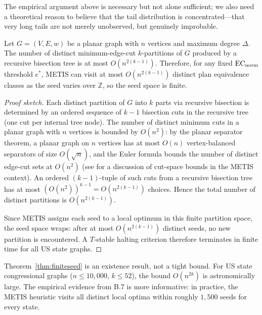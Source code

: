 The empirical argument above is necessary but not alone sufficient; we also
need a theoretical reason to believe that the tail distribution is
concentrated---that very long tails are not merely unobserved, but genuinely
improbable.

\begin{theorem}
\label{thm:finiteseed}
Let $G = (V, E, w)$ be a planar graph with $n$ vertices and maximum
degree $\Delta$.
The number of distinct minimum-edge-cut $k$-partitions of $G$ produced
by a recursive bisection tree is at most $O(n^{2(k-1)})$.
Therefore, for any fixed $\mathrm{EC}_{\mathrm{norm}}$ threshold $e^*$, METIS can visit at most
$O(n^{2(k-1)})$ distinct plan equivalence classes as the seed varies over
$\mathbb{Z}$, so the seed space is finite.
\end{theorem}

\begin{proof}[Proof sketch]
Each distinct partition of $G$ into $k$ parts via recursive bisection is
determined by an ordered sequence of $k-1$ bisection cuts in the recursive tree
(one cut per internal tree node).
The number of distinct minimum cuts in a planar graph with $n$ vertices is bounded
by $O(n^2)$: by the planar separator theorem, a planar graph on $n$ vertices has
at most $O(n)$ vertex-balanced separators of size $O(\sqrt{n})$, and the Euler
formula bounds the number of distinct edge-cut sets at $O(n^2)$
(see \citealt{karypis1998} for a discussion of cut-space bounds in the METIS context).
An ordered $(k-1)$-tuple of such cuts from a recursive bisection tree has at most
$(O(n^2))^{k-1} = O(n^{2(k-1)})$ choices.
Hence the total number of distinct partitions is $O(n^{2(k-1)})$.

Since METIS assigns each seed to a local optimum in this finite partition space,
the seed space wraps: after at most $O(n^{2(k-1)})$ distinct seeds, no new partition
is encountered.
A $T$-stable halting criterion therefore terminates in finite time for
all US state graphs.
\end{proof}

\begin{remark}
Theorem~\ref{thm:finiteseed} is an existence result, not a tight bound.
For US state congressional graphs ($n \le 10{,}000$, $k \le 52$), the bound
$O(n^{2k})$ is astronomically large.
The empirical evidence from B.7 is more informative: in practice, the METIS
heuristic visits all distinct local optima within roughly $1{,}500$ seeds for
every state.
\end{remark}

